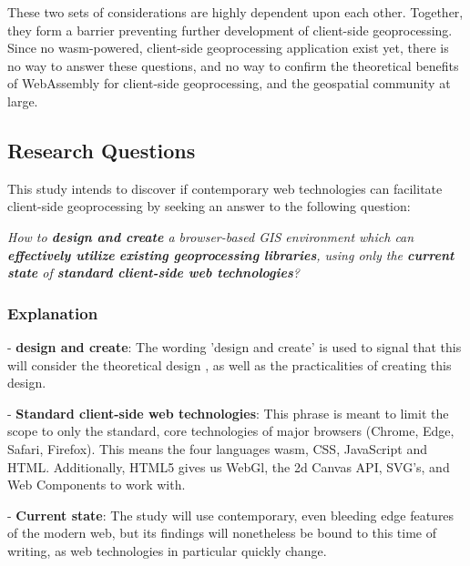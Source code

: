 These two sets of considerations are highly dependent upon each other. Together, they form a barrier preventing further development of client-side geoprocessing. Since no wasm-powered, client-side geoprocessing application exist yet, there is no way to answer these questions, and no way to confirm the theoretical benefits of WebAssembly for client-side geoprocessing, and the geospatial community at large.


\newpage

\subsection{Research Questions}

This study intends to discover if contemporary web technologies can facilitate client-side geoprocessing by seeking an answer to the following question:  

\textit{How to \textbf{design and create} a browser-based GIS environment which can \textbf{effectively utilize} \textbf{existing geoprocessing libraries}, using only the \textbf{current state} of \textbf{standard client-side web technologies}?}

\subsubsection*{Explanation}


- \textbf{design and create}: The wording 'design and create' is used to signal that this will consider the theoretical design , as well as the practicalities of creating this design. 

- \textbf{Standard client-side web technologies}: This phrase is meant to limit the scope to only the standard, core technologies of major browsers (Chrome, Edge, Safari, Firefox). This means the four languages \ac{wasm}, CSS, JavaScript and HTML. Additionally, HTML5 gives us WebGl, the 2d Canvas API, SVG's, and Web Components to work with.

- \textbf{Current state}: The study will use contemporary, even bleeding edge features of the modern web, but its findings will nonetheless be bound to this time of writing, as web technologies in particular quickly change. 

